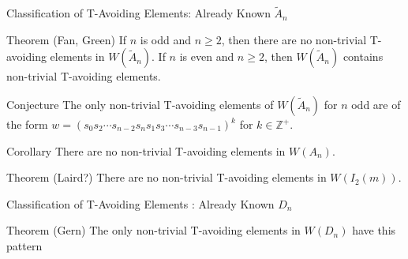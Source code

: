 \documentclass{beamer}
\newcommand\heapblock[4]{\fill[fill=#4, fill opacity=0.35, draw=#4, line width=1.1pt, rounded corners,shift={(\xxaxis:#1)},shift={(\yyaxis:#2)}] (-1,-1) rectangle (1,1);\node at (#1,#2) {\footnotesize $#3$};}
\newcommand\xxaxis{0}
\newcommand\yyaxis{90}
\begin{document}


\begin{frame}{Classification of T-Avoiding Elements: Already Known $\widetilde{A}_n$}

\begin{block}{Theorem (Fan, Green)}
	If $n$ is odd and $n \geq 2$, then there are no non-trivial T-avoiding elements in $W(\widetilde{A}_n)$. If $n$ is even and $n \geq 2$, then $W(\widetilde{A}_n)$ contains non-trivial T-avoiding elements.
\end{block}
\pause
\begin{block}{Conjecture}
The only non-trivial T-avoiding elements of $W(\widetilde{A}_n)$ for $n$ odd are of the form $w=(s_0s_2 \cdots s_{n-2}s_ns_1s_3 \cdots s_{n-3}s_{n-1})^k$  for $k \in \mathbb{Z}^+$.	
\end{block}
\pause
\begin{block}{Corollary}
There are no non-trivial T-avoiding elements in $W(A_n)$.	
\end{block}

\begin{block}{Theorem (Laird?)}
	There are no non-trivial T-avoiding elements in $W(I_2(m))$.
\end{block}

\end{frame}




\begin{frame}{Classification of T-Avoiding Elements : Already Known $D_n$}

\begin{block}{Theorem (Gern)}
The only non-trivial T-avoiding elements in $W(D_n)$ have this pattern	
\end{block}
\pause
\begin{figure}
\end{figure}
	
\end{frame}
\end{document}
